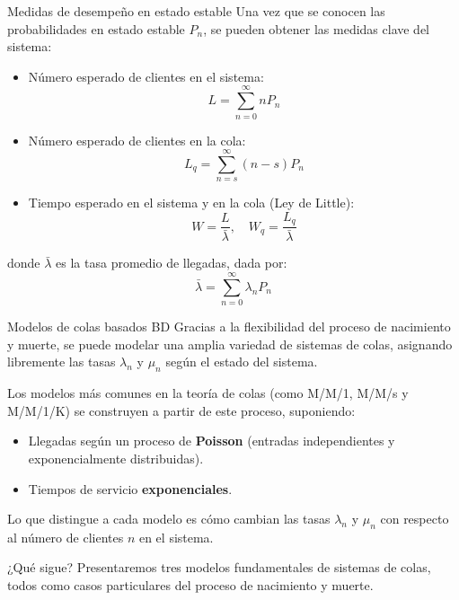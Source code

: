 \documentclass{beamer}
\begin{document}
\begin{frame}{Medidas de desempeño en estado estable}
\justifying
Una vez que se conocen las probabilidades en estado estable $P_n$, se pueden obtener las medidas clave del sistema:

\begin{itemize}
    \item Número esperado de clientes en el sistema:
    \[
    L = \sum_{n=0}^{\infty} n P_n
    \]
    
    \item Número esperado de clientes en la cola:
    \[
    L_q = \sum_{n=s}^{\infty} (n - s) P_n
    \]

    \item Tiempo esperado en el sistema y en la cola (Ley de Little):
    \[
    W = \frac{L}{\bar{\lambda}}, \quad
    W_q = \frac{L_q}{\bar{\lambda}}
    \]
\end{itemize}

donde $\bar{\lambda}$ es la tasa promedio de llegadas, dada por:
\[
\bar{\lambda} = \sum_{n=0}^{\infty} \lambda_n P_n
\]
\end{frame}

\begin{frame}{Modelos de colas basados BD}
\justifying
Gracias a la flexibilidad del proceso de nacimiento y muerte, se puede modelar una amplia variedad de sistemas de colas, asignando libremente las tasas $\lambda_n$ y $\mu_n$ según el estado del sistema.

\medskip
Los modelos más comunes en la teoría de colas (como M/M/1, M/M/s y M/M/1/K) se construyen a partir de este proceso, suponiendo:

\begin{itemize}
    \item Llegadas según un proceso de \textbf{Poisson} (entradas independientes y exponencialmente distribuidas).
    \item Tiempos de servicio \textbf{exponenciales}.
\end{itemize}

\medskip
Lo que distingue a cada modelo es cómo cambian las tasas $\lambda_n$ y $\mu_n$ con respecto al número de clientes $n$ en el sistema.

\begin{block}{¿Qué sigue?}
Presentaremos tres modelos fundamentales de sistemas de colas, todos como casos particulares del proceso de nacimiento y muerte.
\end{block}
\end{frame}
\end{document}
